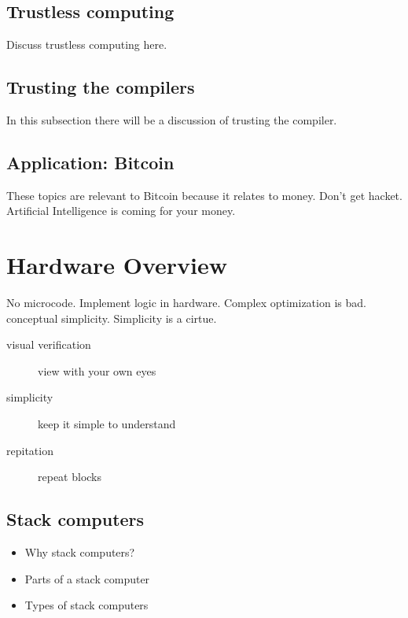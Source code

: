 \subsection*{Trustless computing}
Discuss trustless computing here.

\subsection*{Trusting the compilers}
In this subsection there will be a discussion of trusting the compiler.

\subsection*{Application: Bitcoin}
These topics are relevant to Bitcoin because it relates to money. Don't
get hacket. Artificial Intelligence is coming for your money.


%
\section{Hardware Overview}

No microcode. Implement logic in hardware. Complex optimization is bad. conceptual
simplicity. Simplicity is a cirtue.

\begin{description}
	\item[visual verification] view with your own eyes
	\item[simplicity] keep it simple to understand
        \item[repitation] repeat blocks
\end{description}

\subsection*{Stack computers}
\begin{itemize}
        \item Why stack computers?
        \item Parts of a stack computer
        \item Types of stack computers
\end{itemize}

